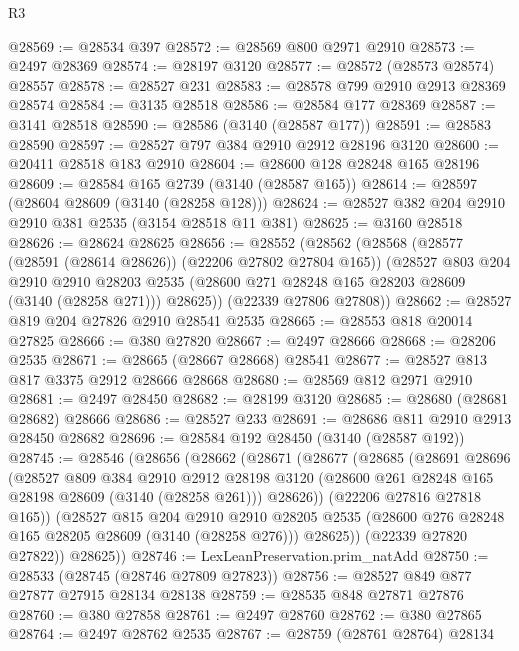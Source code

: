 \begin{lexlean}{R3}
\begin{coremodule}
@28569 := @28534 @397
@28572 := @28569 @800 @2971 @2910
@28573 := @2497 @28369
@28574 := @28197 @3120
@28577 := @28572 (@28573 @28574) @28557
@28578 := @28527 @231
@28583 := @28578 @799 @2910 @2913 @28369 @28574
@28584 := @3135 @28518
@28586 := @28584 @177 @28369
@28587 := @3141 @28518
@28590 := @28586 (@3140 (@28587 @177))
@28591 := @28583 @28590
@28597 := @28527 @797 @384 @2910 @2912 @28196 @3120
@28600 := @20411 @28518 @183 @2910
@28604 := @28600 @128 @28248 @165 @28196
@28609 := @28584 @165 @2739 (@3140 (@28587 @165))
@28614 := @28597 (@28604 @28609 (@3140 (@28258 @128)))
@28624 := @28527 @382 @204 @2910 @2910 @381 @2535 (@3154 @28518 @11 @381)
@28625 := @3160 @28518
@28626 := @28624 @28625
@28656 := @28552
    (@28562
      (@28568
        (@28577 (@28591 (@28614 @28626)) (@22206 @27802 @27804 @165))
        (@28527
          @803
          @204
          @2910
          @2910
          @28203
          @2535
          (@28600 @271 @28248 @165 @28203 @28609 (@3140 (@28258 @271)))
          @28625))
      (@22339 @27806 @27808))
@28662 := @28527 @819 @204 @27826 @2910 @28541 @2535
@28665 := @28553 @818 @20014 @27825
@28666 := @380 @27820
@28667 := @2497 @28666
@28668 := @28206 @2535
@28671 := @28665 (@28667 @28668) @28541
@28677 := @28527 @813 @817 @3375 @2912 @28666 @28668
@28680 := @28569 @812 @2971 @2910
@28681 := @2497 @28450
@28682 := @28199 @3120
@28685 := @28680 (@28681 @28682) @28666
@28686 := @28527 @233
@28691 := @28686 @811 @2910 @2913 @28450 @28682
@28696 := @28584 @192 @28450 (@3140 (@28587 @192))
@28745 := @28546
    (@28656
      (@28662
        (@28671
          (@28677
            (@28685
              (@28691
                @28696
                (@28527
                  @809
                  @384
                  @2910
                  @2912
                  @28198
                  @3120
                  (@28600 @261 @28248 @165 @28198 @28609 (@3140 (@28258 @261)))
                  @28626))
              (@22206 @27816 @27818 @165))
            (@28527
              @815
              @204
              @2910
              @2910
              @28205
              @2535
              (@28600 @276 @28248 @165 @28205 @28609 (@3140 (@28258 @276)))
              @28625))
          (@22339 @27820 @27822))
        @28625))
@28746 := LexLeanPreservation.prim_natAdd
@28750 := @28533 (@28745 (@28746 @27809 @27823))
@28756 := @28527 @849 @877 @27877 @27915 @28134 @28138
@28759 := @28535 @848 @27871 @27876
@28760 := @380 @27858
@28761 := @2497 @28760
@28762 := @380 @27865
@28764 := @2497 @28762 @2535
@28767 := @28759 (@28761 @28764) @28134

\end{coremodule}
\end{lexlean}
